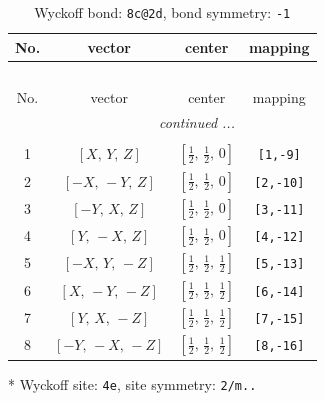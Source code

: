 \documentclass[fleqn,8pt]{jsarticle}
\begin{document}
\begin{longtable}{cccc}
\caption{Wyckoff bond: {\tt 8c@2d}, bond symmetry: {\tt -1}}
 \\
 \hline \hline
No. & vector & center & mapping \\ \hline \endfirsthead

\multicolumn{3}{l}{\tablename\ \thetable{}} \\
 \hline \hline
No. & vector & center & mapping \\ \hline \endhead

 \hline \hline
\multicolumn{3}{r}{\footnotesize\it continued ...} \\ \endfoot

 \hline \hline
\multicolumn{3}{r}{} \\ \endlastfoot

1 & $\left[ X,\, Y,\, Z \right]$ & $\left[ \frac{1}{2},\, \frac{1}{2},\, 0 \right]$ & {\tt [1,-9]} \\ \hline
2 & $\left[ - X,\, - Y,\, Z \right]$ & $\left[ \frac{1}{2},\, \frac{1}{2},\, 0 \right]$ & {\tt [2,-10]} \\ \hline
3 & $\left[ - Y,\, X,\, Z \right]$ & $\left[ \frac{1}{2},\, \frac{1}{2},\, 0 \right]$ & {\tt [3,-11]} \\ \hline
4 & $\left[ Y,\, - X,\, Z \right]$ & $\left[ \frac{1}{2},\, \frac{1}{2},\, 0 \right]$ & {\tt [4,-12]} \\ \hline
5 & $\left[ - X,\, Y,\, - Z \right]$ & $\left[ \frac{1}{2},\, \frac{1}{2},\, \frac{1}{2} \right]$ & {\tt [5,-13]} \\ \hline
6 & $\left[ X,\, - Y,\, - Z \right]$ & $\left[ \frac{1}{2},\, \frac{1}{2},\, \frac{1}{2} \right]$ & {\tt [6,-14]} \\ \hline
7 & $\left[ Y,\, X,\, - Z \right]$ & $\left[ \frac{1}{2},\, \frac{1}{2},\, \frac{1}{2} \right]$ & {\tt [7,-15]} \\ \hline
8 & $\left[ - Y,\, - X,\, - Z \right]$ & $\left[ \frac{1}{2},\, \frac{1}{2},\, \frac{1}{2} \right]$ & {\tt [8,-16]} \\
\end{longtable}
* Wyckoff site: {\tt 4e}, site symmetry: {\tt 2/m..}
\renewcommand{\arraystretch}{1.2}
\end{document}
